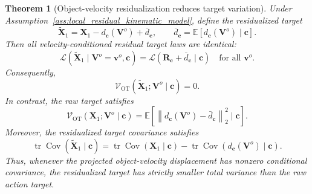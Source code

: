 \documentclass[10pt,twocolumn,letterpaper]{article}
\newtheorem{theorem}{Theorem}
\begin{document}
\begin{theorem}[Object-velocity residualization reduces target variation]
\label{thm:velocity_residualization_reduces_variation}
Under Assumption~\ref{ass:local_residual_kinematic_model}, define the
residualized target
\begin{equation}
    \widetilde{\mathbf X}_1
    =
    \mathbf X_1
    -
    d_{\mathbf c}(\mathbf V^{o})
    +
    \bar d_{\mathbf c},
    \qquad
    \bar d_{\mathbf c}
    =
    \mathbb E
    [
        d_{\mathbf c}(\mathbf V^{o})
        \mid
        \mathbf c
    ].
    \label{eq:residualized_target_variance_analysis}
\end{equation}
Then all velocity-conditioned residual target laws are identical:
\begin{equation}
    \mathcal L
    \left(
        \widetilde{\mathbf X}_1
        \mid
        \mathbf V^{o}=\mathbf v^{o},
        \mathbf c
    \right)
    =
    \mathcal L
    \left(
        \mathbf R_{\mathbf c}
        +
        \bar d_{\mathbf c}
        \mid
        \mathbf c
    \right)
    \quad
    \text{for all } \mathbf v^{o}.
    \label{eq:residual_laws_identical}
\end{equation}
Consequently,
\begin{equation}
    \mathcal V_{\mathrm{OT}}
    (
        \widetilde{\mathbf X}_1;
        \mathbf V^{o}
        \mid
        \mathbf c
    )
    =
    0.
    \label{eq:residual_ot_zero}
\end{equation}
In contrast, the raw target satisfies
\begin{equation}
    \mathcal V_{\mathrm{OT}}
    (
        \mathbf X_1;
        \mathbf V^{o}
        \mid
        \mathbf c
    )
    =
    \mathbb E
    \left[
        \left\|
            d_{\mathbf c}(\mathbf V^{o})
            -
            \bar d_{\mathbf c}
        \right\|_2^2
        \mid
        \mathbf c
    \right].
    \label{eq:ot_variability_value}
\end{equation}
Moreover, the residualized target covariance satisfies
\begin{equation}
    \operatorname{tr}
    \operatorname{Cov}
    (
        \widetilde{\mathbf X}_1
        \mid
        \mathbf c
    )
    =
    \operatorname{tr}
    \operatorname{Cov}
    (
        \mathbf X_1
        \mid
        \mathbf c
    )
    -
    \operatorname{tr}
    \operatorname{Cov}
    (
        d_{\mathbf c}(\mathbf V^{o})
        \mid
        \mathbf c
    ).
    \label{eq:covariance_reduction}
\end{equation}
Thus, whenever the projected object-velocity displacement has nonzero
conditional covariance, the residualized target has strictly smaller total
variance than the raw action target.
\end{theorem}
\end{document}
